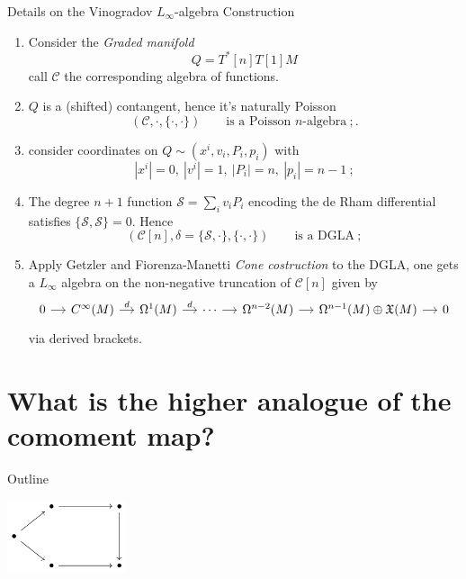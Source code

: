 \documentclass[10pt]{beamer}
\renewcommand{\checkpoint}[0]{
	\setcounter{tocdepth}{1}
	\addtocounter{framenumber}{-1}
 	\begin{frame}[t]{Outline}
  		\tableofcontents[currentsection]
		\begin{center}
			\includegraphics[width=3.5cm]{Pictures/Figure_pentagondiagm_page}
		\end{center}
	\end{frame}
}
\begin{document}
\begin{frame}[t,fragile,shrink=20]{Details on the Vinogradov $L_\infty$-algebra Construction}\label{frame:VinoDetails}
	\begin{enumerate}[<+-| alert@+>]
		\setlength\itemsep{2em}
		\item Consider the \emph{Graded manifold}
		 $$ Q = T^\ast[n] T[1] M $$
		 call $\mathcal{C}$ the corresponding algebra of functions.
		\item $Q$ is a (shifted) contangent, hence it's naturally Poisson
		 $$ (\mathcal{C},\cdot,\{\cdot,\cdot\}) \qquad \text{is a Poisson $n$-algebra}~;.$$
		\item consider coordinates on $Q\sim (x^i,v_i, P_i, p_i)$ with
			$$ |x^i|=0,~ |v^i|=1,~ |P_i|=n, ~ |p_i|=n-1 ~;$$
		\item The degree $n+1$ function $\mathcal{S}= \sum_i v_i P_i$ encoding the de Rham differential satisfies
			$\{\mathcal{S},\mathcal{S}\}=0$. Hence
			 $$ (\mathcal{C}[n],\delta=\{\mathcal{S},\cdot\},\{\cdot,\cdot\}) \qquad \text{is a DGLA}~;$$
		\item Apply Getzler \cite{Getzler1991} and Fiorenza-Manetti \cite{Fiorenza2006}  \emph{Cone costruction} to the DGLA, one gets a $L_\infty$ algebra on the non-negative truncation of $\mathcal{C}[n]$ given by
		\begin{displaymath}
			\begin{tikzcd}[column sep= small,row sep=small]
				0 \ar[r,] & C^\infty(M) \ar["d",r] &
				\Omega^1(M) \ar["d",r] & \cdots \ar[r]
				& \Omega^{n-2}(M) \ar[r]& \Omega^{n-1}(M)\oplus \mathfrak{X}(M) \ar[r] & 0
			\end{tikzcd}
		\end{displaymath}			 
			via derived brackets.	
	\end{enumerate}
	\hfill {}%
\end{frame}








\section{What is the \textbf{higher analogue} of the \textbf{comoment map}?}
\checkpoint	
\end{document}
